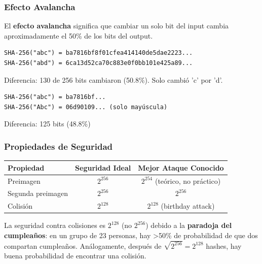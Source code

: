 \documentclass[11pt,a4paper,twoside,openright]{book}
\theoremstyle{definition}
\theoremstyle{plain}
\theoremstyle{remark}
\begin{document}
\subsubsection{Efecto Avalancha}

\begin{clave}
El \textbf{efecto avalancha} significa que cambiar un solo bit del input cambia aproximadamente el 50\% de los bits del output.
\end{clave}

\begin{ejemplo}
\begin{verbatim}
SHA-256("abc") = ba7816bf8f01cfea414140de5dae2223...
SHA-256("abd") = 6ca13d52ca70c883e0f0bb101e425a89...
\end{verbatim}

Diferencia: 130 de 256 bits cambiaron (50.8\%). Solo cambió 'c' por 'd'.

\begin{verbatim}
SHA-256("abc") = ba7816bf...
SHA-256("Abc") = 06d90109... (solo mayúscula)
\end{verbatim}

Diferencia: 125 bits (48.8\%)
\end{ejemplo}

\subsubsection{Propiedades de Seguridad}

\begin{center}
\begin{tabular}{lcc}
\toprule
\textbf{Propiedad} & \textbf{Seguridad Ideal} & \textbf{Mejor Ataque Conocido} \\
\midrule
Preimagen & $2^{256}$ & $2^{254}$ (teórico, no práctico) \\
Segunda preimagen & $2^{256}$ & $2^{256}$ \\
Colisión & $2^{128}$ & $2^{128}$ (birthday attack) \\
\bottomrule
\end{tabular}
\end{center}

\begin{intuicion}
La seguridad contra colisiones es $2^{128}$ (no $2^{256}$) debido a la \textbf{paradoja del cumpleaños}: en un grupo de 23 personas, hay >50\% de probabilidad de que dos compartan cumpleaños. Análogamente, después de $\sqrt{2^{256}} = 2^{128}$ hashes, hay buena probabilidad de encontrar una colisión.
\end{intuicion}
\end{document}
